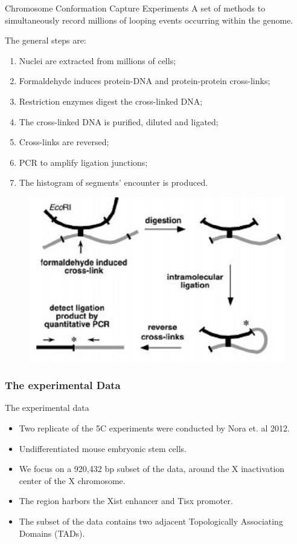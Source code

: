 \documentclass[8pt]{beamer}
\begin{document}
\begin{frame}{Chromosome Conformation Capture Experiments}
A set of methods to simultaneously record millions of looping events occurring within the genome. 

The general steps are:
\begin{enumerate}
\item Nuclei are extracted from millions of cells;
\item Formaldehyde induces protein-DNA and protein-protein cross-links;
\item Restriction enzymes digest the cross-linked DNA;
\item The cross-linked DNA is purified, diluted and ligated;
\item Cross-links are reversed;
\item PCR to amplify ligation junctions;
\item The histogram of segments' encounter is produced.
\end{enumerate}
\begin{figure}[H]
\includegraphics[scale=0.3]{3Cschematic}
\end{figure}
\end{frame}

\subsubsection{The experimental Data}\label{subsubsection_theExperimentalData}

\begin{frame}{The experimental data}
\begin{itemize}
\item Two replicate of the 5C experiments were conducted by Nora et. al 2012. 
\item Undifferentiated mouse embryonic stem cells.
\item We focus on a 920,432 bp subset of the data, around the X inactivation center of the X chromosome. 
\item The region harbors the Xist enhancer and Tisx promoter.
\item The subset of the data contains two adjacent Topologically Associating Domains (TADs).
\end{itemize}
\end{frame}
\end{document}
